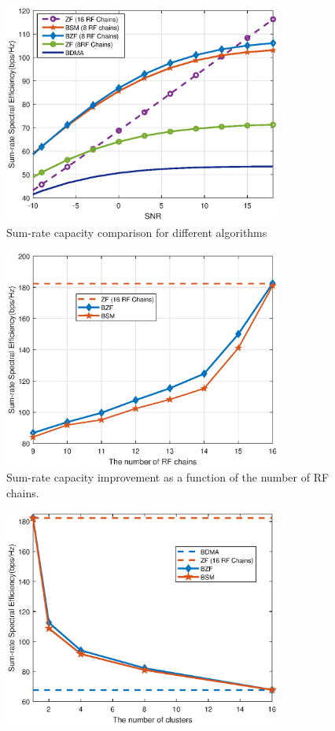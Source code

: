 \documentclass[conference]{IEEEtran}
\begin{document}
{\begin{figure}[ht]
	\begin{center}
		\includegraphics[width=3.6in]{Figure/comp1path.eps}
		\caption{Sum-rate capacity comparison for different algorithms}\label{fig:MultiuserGain}
	\end{center}
\end{figure}
\begin{figure}[ht]
	\begin{center}
		\includegraphics[width=3.6in]{Figure/differentRF1path.eps}
		\caption{Sum-rate capacity improvement as a function of the number of RF chains.}\label{fig:RFchains}
	\end{center}
\end{figure}
\begin{figure}[ht]
	\begin{center}
		\includegraphics[width=3.6in]{Figure/differentK1path.eps}

\end{center}
\end{figure}}
\end{document}
